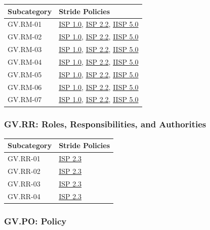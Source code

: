 \documentclass[11pt,landscape]{article}
\begin{document}
\begin{tabularx}{\textwidth}{|p{3.5cm}|X|}
\hline
\rowcolor{headgray} \textbf{Subcategory} & \textbf{Stride Policies} \\
\hline
GV.RM-01 & \hyperref[pol:ISP10]{ISP 1.0}, \hyperref[pol:ISP22]{ISP 2.2}, \hyperref[pol:IISP50]{IISP 5.0} \\
\hline
GV.RM-02 & \hyperref[pol:ISP10]{ISP 1.0}, \hyperref[pol:ISP22]{ISP 2.2}, \hyperref[pol:IISP50]{IISP 5.0} \\
\hline
GV.RM-03 & \hyperref[pol:ISP10]{ISP 1.0}, \hyperref[pol:ISP22]{ISP 2.2}, \hyperref[pol:IISP50]{IISP 5.0} \\
\hline
GV.RM-04 & \hyperref[pol:ISP10]{ISP 1.0}, \hyperref[pol:ISP22]{ISP 2.2}, \hyperref[pol:IISP50]{IISP 5.0} \\
\hline
GV.RM-05 & \hyperref[pol:ISP10]{ISP 1.0}, \hyperref[pol:ISP22]{ISP 2.2}, \hyperref[pol:IISP50]{IISP 5.0} \\
\hline
GV.RM-06 & \hyperref[pol:ISP10]{ISP 1.0}, \hyperref[pol:ISP22]{ISP 2.2}, \hyperref[pol:IISP50]{IISP 5.0} \\
\hline
GV.RM-07 & \hyperref[pol:ISP10]{ISP 1.0}, \hyperref[pol:ISP22]{ISP 2.2}, \hyperref[pol:IISP50]{IISP 5.0} \\
\hline
\end{tabularx}

\subsubsection{GV.RR: Roles, Responsibilities, and Authorities}

\begin{tabularx}{\textwidth}{|p{3.5cm}|X|}
\hline
\rowcolor{headgray} \textbf{Subcategory} & \textbf{Stride Policies} \\
\hline
GV.RR-01 & \hyperref[pol:ISP23]{ISP 2.3} \\
\hline
GV.RR-02 & \hyperref[pol:ISP23]{ISP 2.3} \\
\hline
GV.RR-03 & \hyperref[pol:ISP23]{ISP 2.3} \\
\hline
GV.RR-04 & \hyperref[pol:ISP23]{ISP 2.3} \\
\hline
\end{tabularx}

\subsubsection{GV.PO: Policy}
\end{document}
